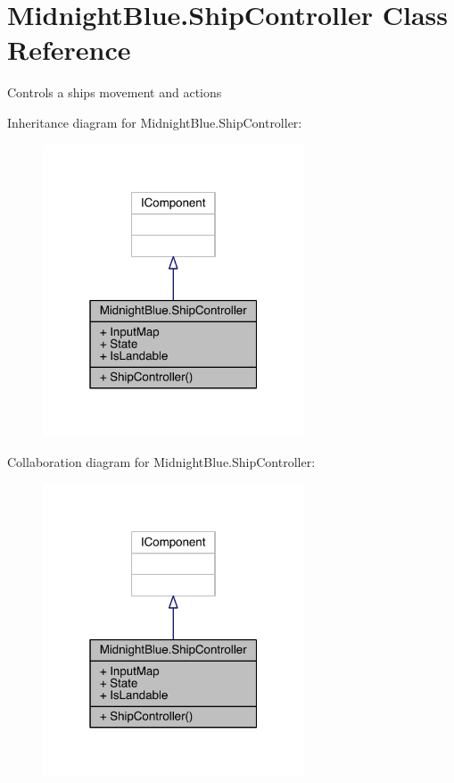 \hypertarget{class_midnight_blue_1_1_ship_controller}{}\section{Midnight\+Blue.\+Ship\+Controller Class Reference}
\label{class_midnight_blue_1_1_ship_controller}


Controls a ships movement and actions  




Inheritance diagram for Midnight\+Blue.\+Ship\+Controller\+:
\nopagebreak
\begin{figure}[H]
\begin{center}
\leavevmode
\includegraphics[width=220pt]{class_midnight_blue_1_1_ship_controller__inherit__graph}
\end{center}
\end{figure}


Collaboration diagram for Midnight\+Blue.\+Ship\+Controller\+:
\nopagebreak
\begin{figure}[H]
\begin{center}
\leavevmode
\includegraphics[width=220pt]{class_midnight_blue_1_1_ship_controller__coll__graph}
\end{center}
\end{figure}
